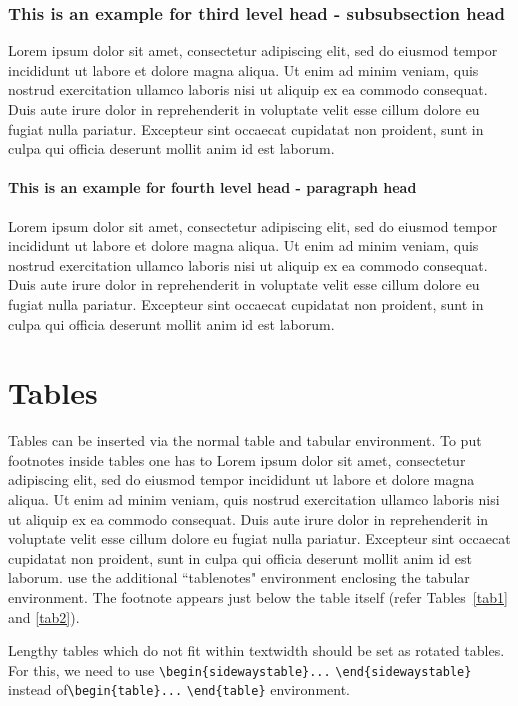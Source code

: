 \documentclass[unnumsec,webpdf,contemporary,large]{oup-authoring-template}%
\theoremstyle{thmstyleone}%
\theoremstyle{thmstyletwo}%
\theoremstyle{thmstylethree}%
\begin{document}
\subsubsection{This is an example for third level head - subsubsection head}\label{subsubsec2}

Lorem ipsum dolor sit amet, consectetur adipiscing elit, sed do eiusmod tempor incididunt ut labore et dolore magna aliqua. Ut enim ad minim veniam, quis nostrud exercitation ullamco laboris nisi ut aliquip ex ea commodo consequat. Duis aute irure dolor in reprehenderit in voluptate velit esse cillum dolore eu fugiat nulla pariatur. Excepteur sint occaecat cupidatat non proident, sunt in culpa qui officia deserunt mollit anim id est laborum.

\paragraph{This is an example for fourth level head - paragraph head}

Lorem ipsum dolor sit amet, consectetur adipiscing elit, sed do eiusmod tempor incididunt ut labore et dolore magna aliqua. Ut enim ad minim veniam, quis nostrud exercitation ullamco laboris nisi ut aliquip ex ea commodo consequat. Duis aute irure dolor in reprehenderit in voluptate velit esse cillum dolore eu fugiat nulla pariatur. Excepteur sint occaecat cupidatat non proident, sunt in culpa qui officia deserunt mollit anim id est laborum.



\section{Tables}\label{sec5}

Tables can be inserted via the normal table and tabular environment. To put
footnotes inside tables one has to Lorem ipsum dolor sit amet, consectetur adipiscing elit, sed do eiusmod tempor incididunt ut labore et dolore magna aliqua. Ut enim ad minim veniam, quis nostrud exercitation ullamco laboris nisi ut aliquip ex ea commodo consequat. Duis aute irure dolor in reprehenderit in voluptate velit esse cillum dolore eu fugiat nulla pariatur. Excepteur sint occaecat cupidatat non proident, sunt in culpa qui officia deserunt mollit anim id est laborum. use the additional ``tablenotes" environment
enclosing the tabular environment. The footnote appears just below the table
itself (refer Tables~\ref{tab1} and \ref{tab2}).

Lengthy tables which do not fit within textwidth should be set as rotated tables. For this, we need to use \verb+\begin{sidewaystable}...+ \verb+\end{sidewaystable}+ instead of\break \verb+\begin{table}...+ \verb+\end{table}+ environment.
\end{document}
